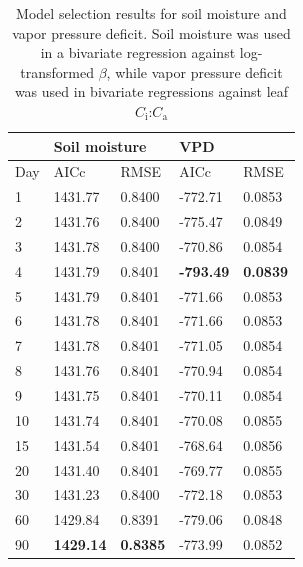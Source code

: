 \newpage
\begin{table}
    \centering
    \caption[Model selection results for soil moisture and vapor pressure deficit]{Model selection results for soil moisture and vapor pressure deficit. Soil moisture was used in a bivariate regression against log-transformed $\beta$, while vapor pressure deficit was used in bivariate regressions against leaf $C_\mathrm{i}$:$C_\mathrm{a}$}
    \label{tab:tab.c4}
        \begin{tabular}{p{2cm}p{2cm}p{2cm}p{2cm}p{2cm}}
            & \multicolumn{2}{l}{Soil moisture} & \multicolumn{2}{l}{VPD} \\
            \hline
            Day & AICc             & RMSE           & AICc              & RMSE      \\
            \hline
            1   & 1431.77          & 0.8400         & -772.71           & 0.0853    \\
            2   & 1431.76          & 0.8400         & -775.47           & 0.0849    \\
            3   & 1431.78          & 0.8400         & -770.86           & 0.0854    \\
            4   & 1431.79          & 0.8401         & \textbf{-793.49}  & \textbf{0.0839}    \\
            5   & 1431.79          & 0.8401         & -771.66           & 0.0853    \\
            6   & 1431.78          & 0.8401         & -771.66           & 0.0853    \\
            7   & 1431.78          & 0.8401         & -771.05           & 0.0854    \\
            8   & 1431.76          & 0.8401         & -770.94           & 0.0854    \\
            9   & 1431.75          & 0.8401         & -770.11           & 0.0854    \\
            10  & 1431.74          & 0.8401         & -770.08           & 0.0855    \\
            15  & 1431.54          & 0.8401         & -768.64           & 0.0856    \\
            20  & 1431.40          & 0.8401         & -769.77           & 0.0855    \\
            30  & 1431.23          & 0.8400         & -772.18           & 0.0853    \\
            60  & 1429.84          & 0.8391         & -779.06           & 0.0848    \\
            90  & \textbf{1429.14} & \textbf{0.8385}& -773.99           & 0.0852    \\
            \hline
\end{tabular}
\end{table}
\clearpage

